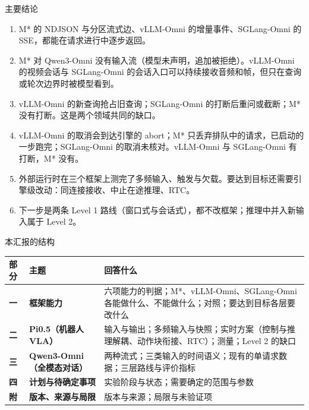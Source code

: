 
\begin{frame}[t]{主要结论}
\footnotesize
\renewcommand{\arraystretch}{1.05}
\begin{enumerate}\setlength\itemsep{2.5pt}
\item {} M* 的 NDJSON 与分区流式边、vLLM-Omni 的增量事件、SGLang-Omni 的 SSE，都能在请求进行中逐步返回。
\item {} M* 对 Qwen3-Omni 没有输入流（模型未声明，追加被拒绝）。vLLM-Omni 的视频会话与 SGLang-Omni 的会话入口可以持续接收音频和帧，但只在查询或轮次边界时被模型看到。
\item {} vLLM-Omni 的新查询抢占旧查询；SGLang-Omni 的打断后重问或截断；M* 没有打断。这是两个领域共同的缺口。
\item {} vLLM-Omni 的取消会到达引擎的 abort；M* 只丢弃排队中的请求，已启动的一步跑完；SGLang-Omni 的取消未核对。vLLM-Omni 与 SGLang-Omni 有打断，M* 没有。
\item {} 外部运行时在三个框架上测完了多频输入、触发与欠载。要达到目标还需要引擎级改动：同连接接收、中止在途推理、RTC。
\item {} 下一步是两条 Level 1 路线（窗口式与会话式），都不改框架；推理中并入新输入属于 Level 2。
\end{enumerate}
\par{}
\end{frame}

\begin{frame}[t]{本汇报的结构}
\scriptsize
\renewcommand{\arraystretch}{1.12}
\setlength{\tabcolsep}{3pt}
\begin{tabularx}{\textwidth}{>{\bfseries}p{1.3cm} >{\bfseries}p{3.4cm} Y}
\toprule
{}
部分 & 主题 & 回答什么 \\
\midrule
一 & 框架能力 & 六项能力的判据；M*、vLLM-Omni、SGLang-Omni 各能做什么、不能做什么；对照；要达到目标各层要改什么 \\
二 & Pi0.5（机器人 VLA） & 输入与输出；多频输入与快照；实时方案（控制与推理解耦、动作块衔接、RTC）；测量；Level 2 的缺口 \\
三 & Qwen3-Omni（全模态对话） & 两种流式；三类输入的时间语义；现有的单请求数据；三层路线与评价指标 \\
四 & 计划与待确定事项 & 实验阶段与状态；需要确定的范围与参数 \\
附 & 版本、来源与局限 & 版本与来源；局限与未验证项 \\
\bottomrule
\end{tabularx}
\par{}
\end{frame}
